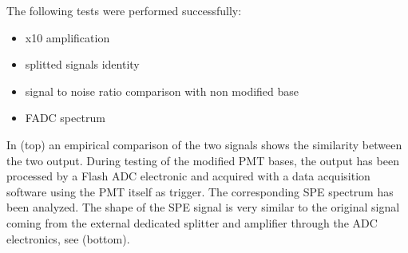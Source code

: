 The following tests were performed successfully:
\begin{itemize}
	\item x10 amplification
	\item splitted signals identity
	\item signal to noise ratio comparison with non modified base
	\item FADC spectrum
\end{itemize}

In  (top) an empirical comparison of the two signals shows the similarity between the two output.
During testing of the modified PMT bases, the output has been processed by a Flash ADC electronic and acquired with a data
acquisition software using the PMT itself as trigger.
The corresponding SPE spectrum has been analyzed. The shape of the SPE signal is very similar to the original signal
coming from the external dedicated splitter and amplifier through the ADC electronics, see   (bottom).

